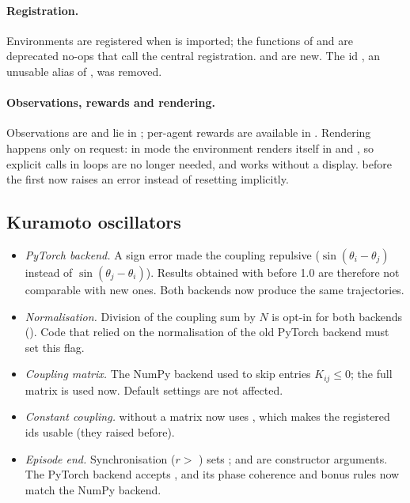 \paragraph{Registration.}
Environments are registered when  is imported; the
 functions of  and
 are deprecated no-ops that call the central
registration.  and  are
new. The id , an unusable alias of , was
removed.

\paragraph{Observations, rewards and rendering.}
Observations are  and lie in ;
per-agent rewards are available in . Rendering
happens only on request: in  mode the environment renders
itself in  and , so explicit 
calls in  loops are no longer needed, and 
works without a display.  before the first  now
raises an error instead of resetting implicitly.

\subsection{Kuramoto oscillators}\label{sec:migration-kuramoto}

\begin{itemize}
  \item \emph{PyTorch backend.} A sign error made the coupling repulsive
    ($\sin(\theta_i - \theta_j)$ instead of $\sin(\theta_j - \theta_i)$).
    Results obtained with  before 1.0 are
    therefore not comparable with new ones. Both backends now produce the same
    trajectories.
  \item \emph{Normalisation.} Division of the coupling sum by $N$ is opt-in
    for both backends (). Code that relied on
    the normalisation of the old PyTorch backend must set this flag.
  \item \emph{Coupling matrix.} The NumPy backend used to skip entries
    $K_{ij} \le 0$; the full matrix is used now. Default settings are not
    affected.
  \item \emph{Constant coupling.}  without a
    matrix now uses , which makes the
    registered  ids usable (they raised before).
  \item \emph{Episode end.} Synchronisation ($r >$ )
    sets ;  and  are
    constructor arguments. The PyTorch backend accepts ,
    and its phase coherence and bonus rules now match the NumPy backend.
\end{itemize}

